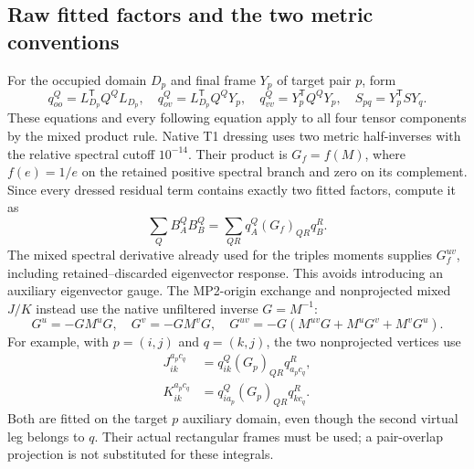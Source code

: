 \documentclass[11pt]{article}
\begin{document}
\subsection{Raw fitted factors and the two metric conventions}
For the occupied domain $D_p$ and final frame $Y_p$ of target pair $p$, form
\begin{equation}
 q_{oo}^Q=L_{D_p}^{\mathsf T}Q^Q L_{D_p},\quad
 q_{ov}^Q=L_{D_p}^{\mathsf T}Q^QY_p,\quad
 q_{vv}^Q=Y_p^{\mathsf T}Q^QY_p,\quad
 S_{pq}=Y_p^{\mathsf T}S Y_q.
\end{equation}
These equations and every following equation apply to all four tensor
components by the mixed product rule. Native T1 dressing uses two metric
half-inverses with the relative spectral cutoff $10^{-14}$. Their product
is $G_f=f(M)$, where $f(e)=1/e$ on the retained positive spectral branch
and zero on its complement. Since every dressed residual term contains
exactly two fitted factors, compute it as
\begin{equation}
 \sum_Q B_A^Q B_B^Q=\sum_{QR}q_A^Q(G_f)_{QR}q_B^R.
\end{equation}
The mixed spectral derivative already used for the triples moments supplies
$G_f^{uv}$, including retained--discarded eigenvector response. This avoids
introducing an auxiliary eigenvector gauge. The MP2-origin exchange and
nonprojected mixed $J/K$ instead use the native unfiltered inverse $G=M^{-1}$:
\begin{equation}
 G^u=-GM^uG,\quad G^v=-GM^vG,\quad
 G^{uv}=-G(M^{uv}G+M^uG^v+M^vG^u).
\end{equation}
For example, with $p=(i,j)$ and $q=(k,j)$, the two nonprojected vertices use
\begin{align}
 J_{ik}^{a_p c_q}&=q_{ik}^{Q}(G_p)_{QR}q_{a_p c_q}^{R},\\
 K_{ik}^{a_p c_q}&=q_{i a_p}^{Q}(G_p)_{QR}q_{k c_q}^{R}.
\end{align}
Both are fitted on the target $p$ auxiliary domain, even though the second
virtual leg belongs to $q$. Their actual rectangular frames must be used;
a pair-overlap projection is not substituted for these integrals.
\end{document}
